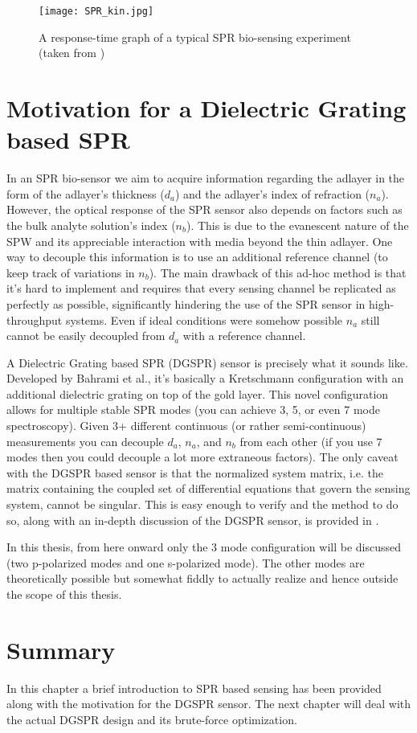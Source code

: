 \begin{figure}
\centering
	\texttt{[image: SPR\_kin.jpg]}
\caption{A response-time graph of a typical SPR bio-sensing experiment (taken from \cite{flow_pdf})}
\label{fig:SPR_kin}
\end{figure}

\section{Motivation for a Dielectric Grating based SPR}

In an SPR bio-sensor we aim to acquire information regarding the adlayer in the form of the adlayer's thickness ($d_a$) and the adlayer's index of refraction ($n_a$). However, the optical response of the SPR sensor also depends on factors such as the bulk analyte solution's index ($n_b$). This is due to the evanescent nature of the SPW and its appreciable interaction with media beyond the thin adlayer. One way to decouple this information is to use an additional reference channel (to keep track of variations in $n_b$). The main drawback of this ad-hoc method is that it's hard to implement and requires that every sensing channel be replicated as perfectly as possible, significantly hindering the use of the SPR sensor in high-throughput systems. Even if ideal conditions were somehow possible $n_a$ still cannot be easily decoupled from $d_a$ with a reference channel. 

A Dielectric Grating based SPR (DGSPR) sensor is precisely what it sounds like. Developed by Bahrami et al., it's basically a Kretschmann configuration with an additional dielectric grating on top of the gold layer. This novel configuration allows for multiple stable SPR modes (you can achieve 3, 5, or even 7 mode spectroscopy). Given 3+ different continuous (or rather semi-continuous) measurements you can decouple $d_a$, $n_a$, and $n_b$ from each other (if you use 7 modes then you could decouple a lot more extraneous factors). The only caveat with the DGSPR based sensor is that the normalized system matrix, i.e. the matrix containing the coupled set of differential equations that govern the sensing system, cannot be singular. This is easy enough to verify and the method to do so, along with an in-depth discussion of the DGSPR sensor, is provided in \cite{farshid_ol}.

In this thesis, from here onward only the 3 mode configuration will be discussed (two p-polarized modes and one s-polarized mode). The other modes are theoretically possible but somewhat fiddly to actually realize and hence outside the scope of this thesis. 

\section{Summary}

In this chapter a brief introduction to SPR based sensing has been provided along with the motivation for the DGSPR sensor. The next chapter will deal with the actual DGSPR design and its brute-force optimization.